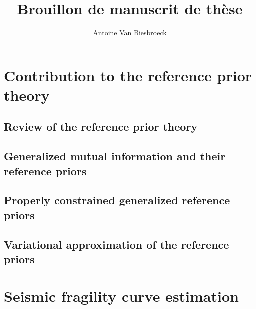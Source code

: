 \documentclass[a4paper]{book}
\title{Brouillon de manuscrit de thèse}
\author{Antoine Van Biesbroeck}
\begin{document}
\maketitle

\tableofcontents







\part{Contribution to the reference prior theory}\label{part:ref-theory}


\chapter{Review of the reference prior theory}\label{chap:intro-ref}




\chapter{Generalized mutual information and their reference priors}\label{chap:ref-generalized}




\chapter{Properly constrained generalized reference priors}\label{chap:constrained-prior}




\chapter{Variational approximation of the reference priors}\label{chap:varp}




\part{Seismic fragility curve estimation}\label{part:spra}
\end{document}
